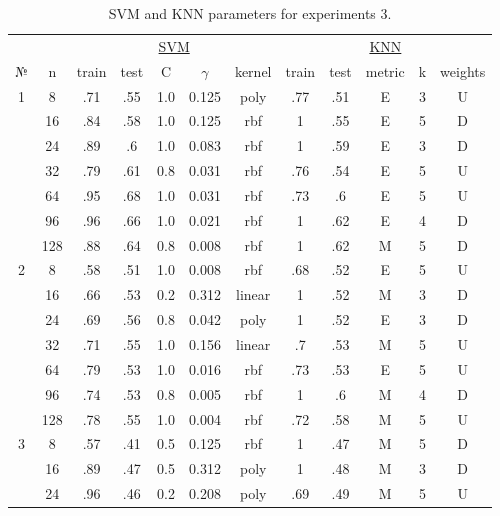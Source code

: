 \begin{table}
\centering
\caption{SVM and KNN parameters for experiments 3.}
\label{tab:params_3_svm_knn}
\begin{tabular}{|c|c|ccccc||ccccc|}\hline
& & \multicolumn{5}{c||}{\underline{SVM}} & \multicolumn{5}{c|}{\underline{KNN}}\\
№ &   n & train & test &   C & $\gamma$ &  kernel & train & test & metric & k & weights \\\hline
1 &   8 &   .71 &  .55 & 1.0 &    0.125 &    poly &   .77 &  .51 &      E & 3 &       U \\
  &  16 &   .84 &  .58 & 1.0 &    0.125 &     rbf &     1 &  .55 &      E & 5 &       D \\
  &  24 &   .89 &   .6 & 1.0 &    0.083 &     rbf &     1 &  .59 &      E & 3 &       D \\
  &  32 &   .79 &  .61 & 0.8 &    0.031 &     rbf &   .76 &  .54 &      E & 5 &       U \\
  &  64 &   .95 &  .68 & 1.0 &    0.031 &     rbf &   .73 &   .6 &      E & 5 &       U \\
  &  96 &   .96 &  .66 & 1.0 &    0.021 &     rbf &     1 &  .62 &      E & 4 &       D \\
  & 128 &   .88 &  .64 & 0.8 &    0.008 &     rbf &     1 &  .62 &      M & 5 &       D \\\hline
2 &   8 &   .58 &  .51 & 1.0 &    0.008 &     rbf &   .68 &  .52 &      E & 5 &       U \\
  &  16 &   .66 &  .53 & 0.2 &    0.312 &  linear &     1 &  .52 &      M & 3 &       D \\
  &  24 &   .69 &  .56 & 0.8 &    0.042 &    poly &     1 &  .52 &      E & 3 &       D \\
  &  32 &   .71 &  .55 & 1.0 &    0.156 &  linear &    .7 &  .53 &      M & 5 &       U \\
  &  64 &   .79 &  .53 & 1.0 &    0.016 &     rbf &   .73 &  .53 &      E & 5 &       U \\
  &  96 &   .74 &  .53 & 0.8 &    0.005 &     rbf &     1 &   .6 &      M & 4 &       D \\
  & 128 &   .78 &  .55 & 1.0 &    0.004 &     rbf &   .72 &  .58 &      M & 5 &       U \\\hline
3 &   8 &   .57 &  .41 & 0.5 &    0.125 &     rbf &     1 &  .47 &      M & 5 &       D \\
  &  16 &   .89 &  .47 & 0.5 &    0.312 &    poly &     1 &  .48 &      M & 3 &       D \\
  &  24 &   .96 &  .46 & 0.2 &    0.208 &    poly &   .69 &  .49 &      M & 5 &       U \\

\end{tabular}
\end{table}
